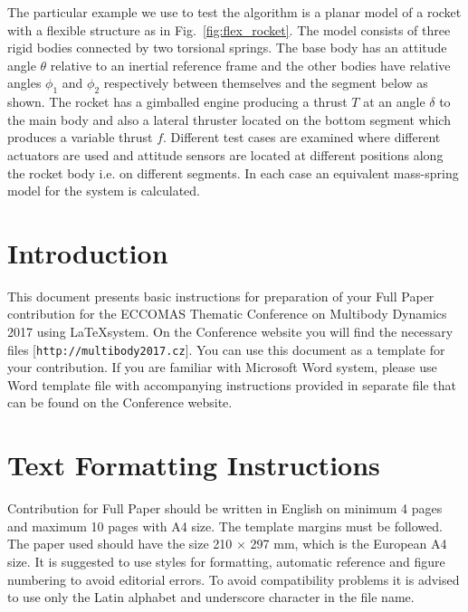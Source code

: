 \documentclass{mbd_fullpaper}
\begin{document}
The particular example we use to test the algorithm is a planar model of a rocket with a flexible structure as in Fig.~\ref{fig:flex_rocket}. The model consists of three rigid bodies connected by two torsional springs. The base body has an attitude angle $\theta$ relative to an inertial reference frame and the other bodies have relative angles $\phi_1$ and $\phi_2$ respectively between themselves and the segment below as shown. The rocket has a gimballed engine producing a thrust $T$ at an angle $\delta$ to the main body and also a lateral thruster located on the bottom segment which produces a variable thrust $f$. Different test cases are examined where different actuators are used and attitude sensors are located at different positions along the rocket body i.e. on different segments. In each case an equivalent mass-spring model for the system is calculated.

\section{Introduction}

This document presents basic instructions for preparation of your Full Paper contribution for the ECCOMAS Thematic Conference on Multibody Dynamics 2017 using \LaTeX system. On the Conference website you will find the necessary files [\texttt{http://multibody2017.cz}]. You can use this document as a template for your contribution. If you are familiar with Microsoft Word system, please use Word template file with accompanying instructions provided in separate file that can be found on the Conference website.


\section{Text Formatting Instructions}
Contribution for Full Paper should be written in English on minimum 4 pages and maximum 10 pages with A4 size. The template margins must be followed. The paper used should have the size 210 $\times$ 297 mm, which is the European A4 size. It is suggested to use styles for formatting, automatic reference and figure numbering to avoid editorial errors. To avoid compatibility problems it is advised to use only the Latin alphabet and underscore character in the file name.
\end{document}
